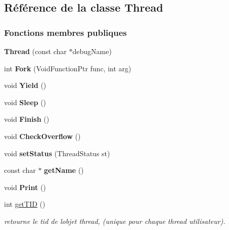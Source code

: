 \hypertarget{class_thread}{}\subsection{Référence de la classe Thread}
\label{class_thread}
\subsubsection*{Fonctions membres publiques}
\begin{DoxyCompactItemize}
\item 
\hypertarget{class_thread_aeef00ecb5eda30734cff97a0ac492bdd}{}\label{class_thread_aeef00ecb5eda30734cff97a0ac492bdd} 
{\bfseries Thread} (const char $\ast$debug\+Name)
\item 
\hypertarget{class_thread_af855fdbb46192090ce0f8c5e7a263eeb}{}\label{class_thread_af855fdbb46192090ce0f8c5e7a263eeb} 
int {\bfseries Fork} (Void\+Function\+Ptr func, int arg)
\item 
\hypertarget{class_thread_adbc2bfb172d2eff4b46882aade9eeb8a}{}\label{class_thread_adbc2bfb172d2eff4b46882aade9eeb8a} 
void {\bfseries Yield} ()
\item 
\hypertarget{class_thread_a187a4c1e62087511b69068220840244a}{}\label{class_thread_a187a4c1e62087511b69068220840244a} 
void {\bfseries Sleep} ()
\item 
\hypertarget{class_thread_a1e43c788c40e9783311c970bcea7239b}{}\label{class_thread_a1e43c788c40e9783311c970bcea7239b} 
void {\bfseries Finish} ()
\item 
\hypertarget{class_thread_afa6657ff14b9c6866eadd85ea32c9147}{}\label{class_thread_afa6657ff14b9c6866eadd85ea32c9147} 
void {\bfseries Check\+Overflow} ()
\item 
\hypertarget{class_thread_a39061ce2692542188f82f909d005b1c3}{}\label{class_thread_a39061ce2692542188f82f909d005b1c3} 
void {\bfseries set\+Status} (Thread\+Status st)
\item 
\hypertarget{class_thread_aed303e0688ec792e41fb9b7429a3d948}{}\label{class_thread_aed303e0688ec792e41fb9b7429a3d948} 
const char $\ast$ {\bfseries get\+Name} ()
\item 
\hypertarget{class_thread_ad707af00a9ce1a1d324804e7c73dc4ab}{}\label{class_thread_ad707af00a9ce1a1d324804e7c73dc4ab} 
void {\bfseries Print} ()
\item 
int \hyperlink{class_thread_a4cb215377b6846f0e9a33084d3d61b68}{get\+T\+ID} ()
\begin{DoxyCompactList}\small\item\em retourne le tid de l\textquotesingle{}objet thread, (unique pour chaque thread utilisateur). \end{DoxyCompactList}\item 

\end{DoxyCompactItemize}
